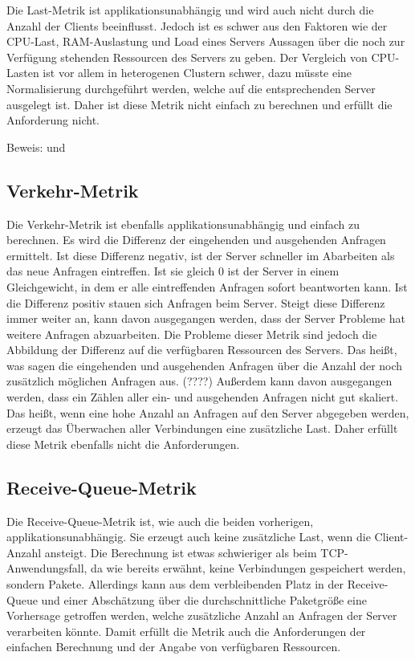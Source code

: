 \documentclass[a4paper, 12pt, BCOR10mm, DIV12, toc=bibliography, toc=listof, german]{scrbook}
\begin{document}
		Die Last-Metrik ist applikationsunabhängig und wird auch nicht durch die Anzahl der Clients
		beeinflusst. Jedoch ist es schwer aus den Faktoren wie der CPU-Last, RAM-Auslastung und Load
		eines Servers Aussagen über die noch zur Verfügung stehenden Ressourcen des Servers zu geben.
		Der Vergleich von CPU-Lasten ist vor allem in heterogenen Clustern schwer, dazu müsste eine
		Normalisierung durchgeführt werden, welche auf die entsprechenden Server ausgelegt ist. Daher
		ist diese Metrik nicht einfach zu berechnen und erfüllt die Anforderung nicht.

		Beweis: \cite{kunz1991} und \cite{lansch1994}


		\subsection*{Verkehr-Metrik} %

		Die Verkehr-Metrik ist ebenfalls applikationsunabhängig und einfach zu berechnen. Es wird die
		Differenz der eingehenden und ausgehenden Anfragen ermittelt. Ist diese Differenz negativ, ist
		der Server schneller im Abarbeiten als das neue Anfragen eintreffen. Ist sie gleich 0 ist der
		Server in einem Gleichgewicht, in dem er alle eintreffenden Anfragen sofort beantworten kann.
		Ist die Differenz positiv stauen sich Anfragen beim Server. Steigt diese Differenz immer
		weiter an, kann davon ausgegangen werden, dass der Server Probleme hat weitere Anfragen
		abzuarbeiten. Die Probleme dieser Metrik sind jedoch die Abbildung der Differenz auf die
		verfügbaren Ressourcen des Servers. Das heißt, was sagen die eingehenden und ausgehenden Anfragen
		über die Anzahl der noch zusätzlich möglichen Anfragen aus. (????) Außerdem kann davon ausgegangen
		werden, dass ein Zählen aller ein- und ausgehenden Anfragen nicht gut skaliert. Das heißt, wenn
		eine hohe Anzahl an Anfragen auf den Server abgegeben werden, erzeugt das Überwachen aller
		Verbindungen eine zusätzliche Last. Daher erfüllt diese Metrik ebenfalls nicht die
		Anforderungen.
		

		\subsection*{Receive-Queue-Metrik} %

		Die Receive-Queue-Metrik ist, wie auch die beiden vorherigen, applikationsunabhängig. Sie
		erzeugt auch keine zusätzliche Last, wenn die Client-Anzahl ansteigt. Die Berechnung ist etwas
		schwieriger als beim TCP-Anwendungsfall, da wie bereits erwähnt, keine Verbindungen gespeichert
		werden, sondern Pakete. Allerdings kann aus dem verbleibenden Platz in der Receive-Queue und
		einer Abschätzung über die durchschnittliche Paketgröße eine Vorhersage getroffen werden, welche
		zusätzliche Anzahl an Anfragen der Server verarbeiten könnte. Damit erfüllt die Metrik auch die
		Anforderungen der einfachen Berechnung und der Angabe von verfügbaren Ressourcen.
		
\end{document}
